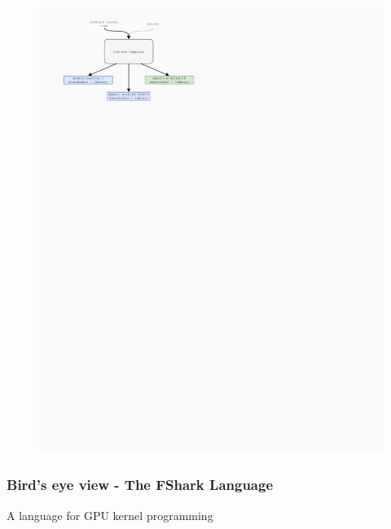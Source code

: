 \documentclass[10pt, compress, usenames, dvipsnames]{beamer}
\begin{document}
\begin{frame}[fragile]
\begin{figure}
\begin{overprint}
        \includegraphics{./images/futhark_diagram_after.pdf}
      \end{overprint}
    \end{figure}

\end{frame}

\begin{frame}[plain,c]
  \frametitle{Bird's eye view - The FShark Language}
  \begin{center}
    \Huge A language for GPU kernel programming
  \end{center}
\end{frame}
\end{document}
